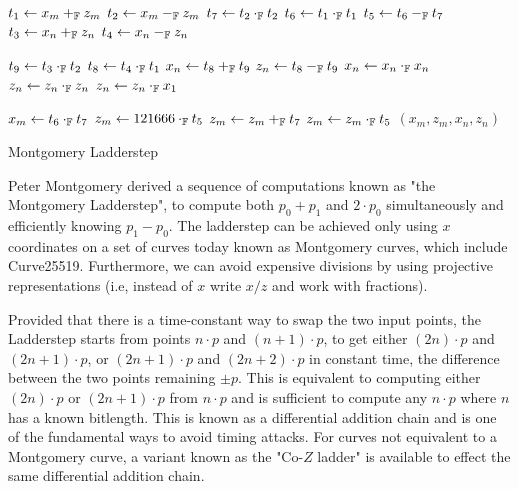 \begin{algorithm}[h]
\label{evaluation:ladder-step:montgomery}
\begin{algorithmic}[1]
\begin{multicols}{3}
\State $t_1 \leftarrow x_m +_{\mathbb{F}} z_m$
\State $t_2 \leftarrow x_m -_{\mathbb{F}} z_m$
\State $t_7 \leftarrow t_2 \cdot_{\mathbb{F}} t_2$
\State $t_6 \leftarrow t_1 \cdot_{\mathbb{F}} t_1$
\State $t_5 \leftarrow t_6 -_{\mathbb{F}} t_7$
\State $t_3 \leftarrow x_n +_{\mathbb{F}} z_n$
\State $t_4 \leftarrow x_n -_{\mathbb{F}} z_n$\rule{0ex}{0ex}
\State $t_9 \leftarrow t_3 \cdot_{\mathbb{F}} t_2$
\State $t_8 \leftarrow t_4 \cdot_{\mathbb{F}} t_1$
\State $x_n \leftarrow t_8 +_{\mathbb{F}} t_9$
\State $z_n \leftarrow t_8 -_{\mathbb{F}} t_9$
\State $x_n \leftarrow x_{n} \cdot_{\mathbb{F}} x_{n}$
\State $z_n \leftarrow z_{n} \cdot_{\mathbb{F}} z_{n}$
\State $z_n \leftarrow z_{n} \cdot_{\mathbb{F}} x_1$\rule{0ex}{0ex} 
\State $x_m \leftarrow t_6 \cdot_{\mathbb{F}} t_7$
\State $z_m \leftarrow 121666 \cdot_{\mathbb{F}} t_5$
\State $z_m \leftarrow z_m +_{\mathbb{F}} t_7$
\State $z_m \leftarrow z_m \cdot_{\mathbb{F}} t_5$
\State \Return $(x_m, z_m, x_n, z_n)$
\EndFunction
\end{multicols}
\end{algorithmic}
\caption{Montgomery Ladderstep}
\end{algorithm}

Peter Montgomery derived a sequence of computations known
as "the Montgomery Ladderstep", to compute both $p_0+p_1$ and $2\cdot p_0$
simultaneously and efficiently knowing $p_1-p_0$.  The ladderstep can
be achieved only using $x$ coordinates on a set of curves today known as
Montgomery curves, which include Curve25519.  Furthermore, we can
avoid expensive divisions by using projective representations (i.e,
instead of $x$ write $x/z$ and work  with fractions).  

Provided that there is a time-constant way to swap the two input
points, the Ladderstep starts from points $n \cdot p $ and
$ (n+1) \cdot p $, to get either $ (2n) \cdot p $ and
$(2n+1) \cdot p$, or $(2n+1) \cdot p$ and $(2n+2) \cdot p$ in constant
time, the difference between the two points remaining $\pm p$.  This
is equivalent to computing either $(2n) \cdot p$ or $(2n+1) \cdot p$
from $n \cdot p$ and is sufficient to compute any $n \cdot p$ where
$n$ has a known bitlength.  This is known as a differential
addition chain and is one of the fundamental ways to avoid timing
attacks.  For curves not equivalent to a Montgomery curve, a variant
known as the "Co-$Z$ ladder" is available to effect the same
differential addition chain.


